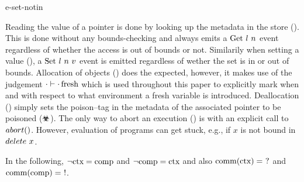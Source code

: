 \documentclass[utf8,acmsmall,review,screen,dvipsnames]{acmart}
\begin{document}
\begin{center}
{  }{e-set-notin}
\end{center}

Reading the value of a pointer is done by looking up the metadata in the store ().
This is done without any bounds-checking and always emits a $\text{Get}\ l\ n$ event regardless of whether the access is out of bounds or not.
Similarily when setting a value (), a $\ev{Set}\ \loc\ n\ \valueexpr$ event is emitted regardless of wether the set is in or out of bounds.
Allocation of objects () does the expected, however, it makes use of the judgement $\cdot\vdash{\cdot}\operatorname{fresh}$ which is used throughout this paper to explicitly mark when and with respect to what environment a fresh variable is introduced.
Deallocation () simply sets the poison--tag in the metadata of the associated pointer to be poisoned ($\poisoned$).
The only way to abort an execution () is with an explicit call to ${abort()}$.
However, evaluation of programs can get stuck, e.g., if $x$ is not bound in ${delete}\ x$.

In the following, $\neg\text{ctx}=\text{comp}$ and $\neg\text{comp}=\text{ctx}$ and also $\operatorname{comm}(\text{ctx})=\  ? $ and $\operatorname{comm}(\comp)=\ \comptoctx$.
\end{document}

